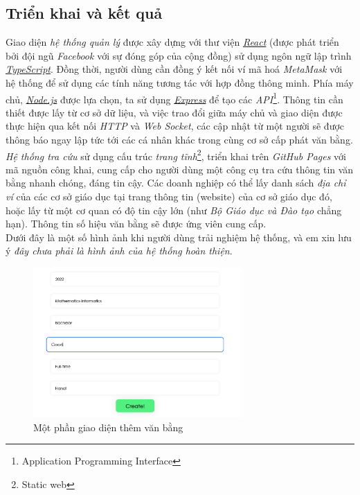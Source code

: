\newpage
\subsection{Triển khai và kết quả}

Giao diện \textit{hệ thống quản lý} được xây dựng với thư viện \href{https://reactjs.org}{\textit{React}} (được phát triển bởi đội ngũ \textit{Facebook} với sự đóng góp của cộng đồng) sử dụng ngôn ngữ lập trình \href{https://www.typescriptlang.org/}{\textit{TypeScript}}. Đồng thời, người dùng cần đồng ý kết nối ví mã hoá \textit{MetaMask} với hệ thống để sử dụng các tính năng tương tác với hợp đồng thông minh. Phía máy chủ, \href{https://nodejs.org}{\textit{Node.js}} được lựa chọn, ta sử dụng \href{https://expressjs.com/}{\textit{Express}} để tạo các \textit{API}\footnote{Application Programming Interface}. Thông tin cần thiết được lấy từ cơ sở dữ liệu, và việc trao đổi giữa máy chủ và giao diện được thực hiện qua kết nối \textit{HTTP} và \textit{Web Socket}, các cập nhật từ một người sẽ được thông báo ngay lập tức tới các cá nhân khác trong cùng cơ sở cấp phát văn bằng.\\

\textit{Hệ thống tra cứu} sử dụng cấu trúc \textit{trang tĩnh}\footnote{Static web}, triển khai trên \textit{GitHub Pages} với mã nguồn công khai, cung cấp cho người dùng một công cụ tra cứu thông tin văn bằng nhanh chóng, đáng tin cậy. Các doanh nghiệp có thể lấy danh sách \textit{địa chỉ ví} của các cơ sở giáo dục tại trang thông tin (website) của cơ sở giáo dục đó, hoặc lấy từ một cơ quan có độ tin cậy lớn (như \textit{Bộ Giáo dục và Đào tạo} chẳng hạn). Thông tin số hiệu văn bằng sẽ được ứng viên cung cấp.\\

Dưới đây là một số hình ảnh khi người dùng trải nghiệm hệ thống, và em xin lưu ý \textit{đây chưa phải là hình ảnh của hệ thống hoàn thiện}.\\

\begin{figure}[!ht]
    \centering
    \includegraphics[width=300px]{images/app-create-cert.png}
    \caption{Một phần giao diện thêm văn bằng}
\end{figure}

